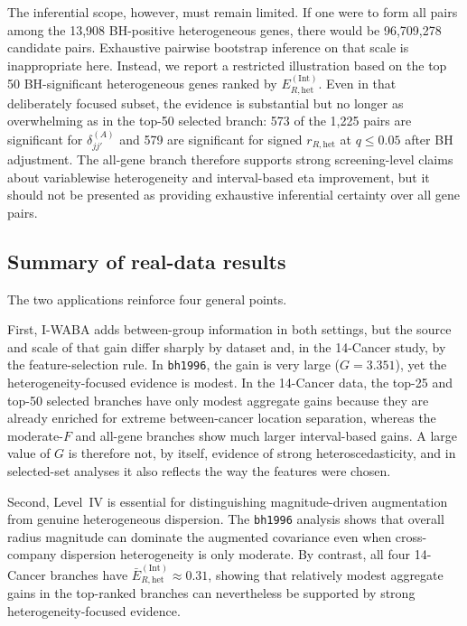 \documentclass[preprint, times, 12pt, authoryear]{elsarticle}
\begin{document}
The inferential scope, however, must remain limited. If one were to form all pairs among the 13,908 BH-positive heterogeneous genes, there would be 96,709,278 candidate pairs. Exhaustive pairwise bootstrap inference on that scale is inappropriate here. Instead, we report a restricted illustration based on the top 50 BH-significant heterogeneous genes ranked by \(E_{R,\mathrm{het}}^{(\mathrm{Int})}\). Even in that deliberately focused subset, the evidence is substantial but no longer as overwhelming as in the top-50 selected branch: 573 of the 1,225 pairs are significant for \(\delta_{jj'}^{(A)}\) and 579 are significant for signed \(r_{R,\mathrm{het}}\) at \(q\le 0.05\) after BH adjustment. The all-gene branch therefore supports strong screening-level claims about variablewise heterogeneity and interval-based eta improvement, but it should not be presented as providing exhaustive inferential certainty over all gene pairs.

\subsection{Summary of real-data results}

The two applications reinforce four general points.

First, I-WABA adds between-group information in both settings, but the source and scale of that gain differ sharply by dataset and, in the 14-Cancer study, by the feature-selection rule. In \texttt{bh1996}, the gain is very large (\(G=3.351\)), yet the heterogeneity-focused evidence is modest. In the 14-Cancer data, the top-25 and top-50 selected branches have only modest aggregate gains because they are already enriched for extreme between-cancer location separation, whereas the moderate-$F$ and all-gene branches show much larger interval-based gains. A large value of \(G\) is therefore not, by itself, evidence of strong heteroscedasticity, and in selected-set analyses it also reflects the way the features were chosen.

Second, Level~IV is essential for distinguishing magnitude-driven augmentation from genuine heterogeneous dispersion. The \texttt{bh1996} analysis shows that overall radius magnitude can dominate the augmented covariance even when cross-company dispersion heterogeneity is only moderate. By contrast, all four 14-Cancer branches have \(\bar E_{R,\mathrm{het}}^{(\mathrm{Int})}\approx 0.31\), showing that relatively modest aggregate gains in the top-ranked branches can nevertheless be supported by strong heterogeneity-focused evidence.
\end{document}
